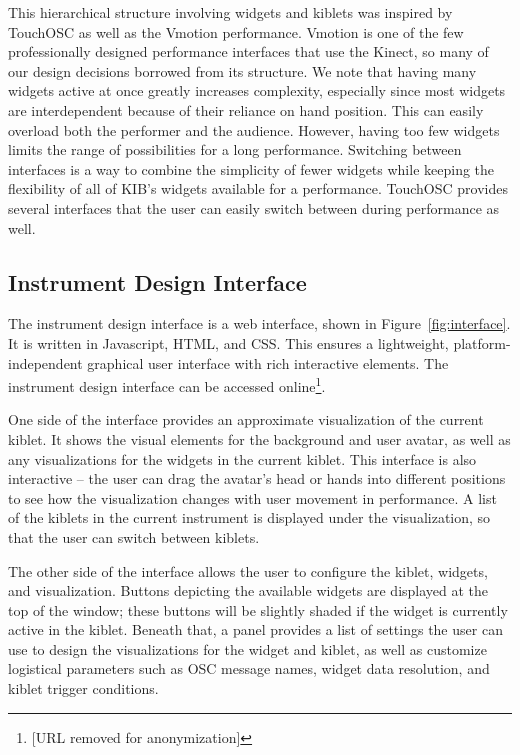 \documentclass{nime-alternate}
\begin{document}
This hierarchical structure involving widgets and kiblets was inspired by TouchOSC as well as the Vmotion 
performance. Vmotion is one of the few professionally designed performance interfaces that use the Kinect,
so many of our design decisions borrowed from its structure. We note that having many
widgets active at once greatly increases complexity, especially since most widgets 
are interdependent because of their reliance on hand position.
This can easily overload both the performer and the audience.
However, having too few widgets limits the range of possibilities for a long
performance. Switching between interfaces is a way to combine the simplicity of
fewer widgets while keeping the flexibility of all of KIB's widgets available for a performance. 
TouchOSC provides several interfaces that the user can easily switch between during performance
as well.

\subsection{Instrument Design Interface}
The instrument design interface is a web interface, shown in Figure~\ref{fig:interface}. It is written in Javascript,
HTML, and CSS. This ensures a lightweight, platform-independent graphical user interface
with rich interactive elements. The instrument design interface can be accessed online\footnote{[URL removed for anonymization]}.

One side of the interface provides an approximate visualization of the current kiblet. It shows the visual
elements for the background and user avatar, as well as any visualizations for the widgets
in the current kiblet. This interface is also interactive -- the user can drag the avatar's head or hands
into different positions to see how the visualization changes with user movement in performance. A list of the kiblets in the current instrument is displayed under the visualization, so
that the user can switch between kiblets.

The other side of the interface allows the user to configure the kiblet, widgets, and visualization.
Buttons depicting the available widgets are displayed at the top of the window; these buttons will be
slightly shaded if the widget is currently active in the kiblet. Beneath that, a panel provides a list of
settings the user can use to design the visualizations for the widget and kiblet, as well as customize logistical
parameters such as OSC message names, widget data resolution, and kiblet trigger conditions.
\end{document}
